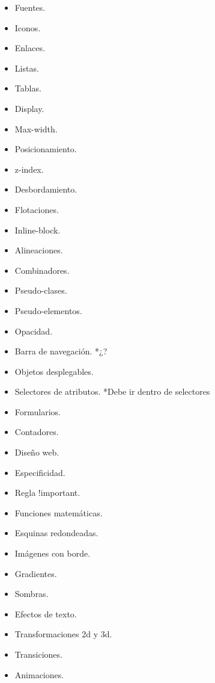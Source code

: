 \documentclass[12pt, letterpaper]{article}
\begin{document}
\begin{enumerate}
\begin{itemize}
\begin{enumerate}
\begin{itemize}
                \item Fuentes.
                \item Iconos.
                \item Enlaces.
                \item Listas.
                \item Tablas.
                \item Display.
                \item Max-width.
                \item Posicionamiento.
                \item z-index.
                \item Desbordamiento.
                \item Flotaciones.
                \item Inline-block.
                \item Alineaciones.
                \item Combinadores.
                \item Pseudo-clases.
                \item Pseudo-elementos.
                \item Opacidad.
                \item Barra de navegación. *¿?
                \item Objetos desplegables.
                \item Selectores de atributos. *Debe ir dentro de selectores
                \item Formularios.
                \item Contadores.
                \item Diseño web.
                \item Especificidad.
                \item Regla !important.
                \item Funciones matemáticas.
                \item Esquinas redondeadas.
                \item Imágenes con borde.
                \item Gradientes.
                \item Sombras.
                \item Efectos de texto.
                \item Transformaciones 2d y 3d.
                \item Transiciones.
                \item Animaciones.

\end{itemize}
\end{enumerate}
\end{itemize}
\end{enumerate}
\end{document}
